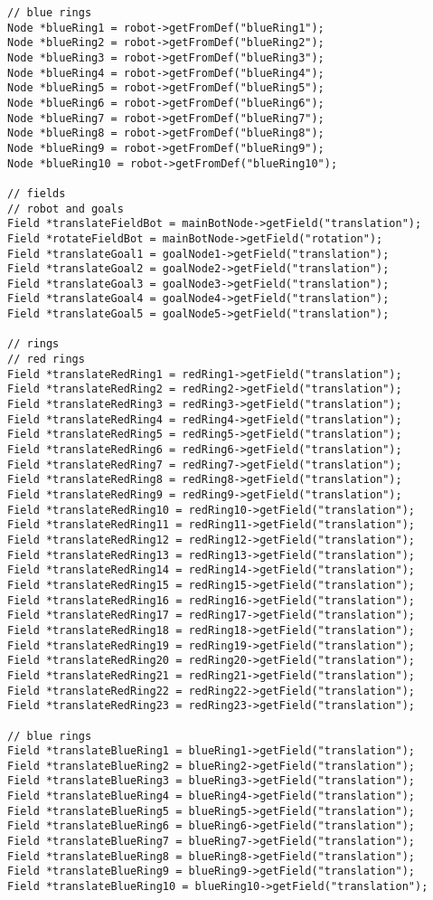 \begin{verbatim}
// blue rings
Node *blueRing1 = robot->getFromDef("blueRing1");
Node *blueRing2 = robot->getFromDef("blueRing2");
Node *blueRing3 = robot->getFromDef("blueRing3");
Node *blueRing4 = robot->getFromDef("blueRing4");
Node *blueRing5 = robot->getFromDef("blueRing5");
Node *blueRing6 = robot->getFromDef("blueRing6");
Node *blueRing7 = robot->getFromDef("blueRing7");
Node *blueRing8 = robot->getFromDef("blueRing8");
Node *blueRing9 = robot->getFromDef("blueRing9");
Node *blueRing10 = robot->getFromDef("blueRing10");
 
// fields
// robot and goals
Field *translateFieldBot = mainBotNode->getField("translation");
Field *rotateFieldBot = mainBotNode->getField("rotation");
Field *translateGoal1 = goalNode1->getField("translation");
Field *translateGoal2 = goalNode2->getField("translation");
Field *translateGoal3 = goalNode3->getField("translation");
Field *translateGoal4 = goalNode4->getField("translation");
Field *translateGoal5 = goalNode5->getField("translation");
 
// rings
// red rings
Field *translateRedRing1 = redRing1->getField("translation");
Field *translateRedRing2 = redRing2->getField("translation");
Field *translateRedRing3 = redRing3->getField("translation");
Field *translateRedRing4 = redRing4->getField("translation");
Field *translateRedRing5 = redRing5->getField("translation");
Field *translateRedRing6 = redRing6->getField("translation");
Field *translateRedRing7 = redRing7->getField("translation");
Field *translateRedRing8 = redRing8->getField("translation");
Field *translateRedRing9 = redRing9->getField("translation");
Field *translateRedRing10 = redRing10->getField("translation");
Field *translateRedRing11 = redRing11->getField("translation");
Field *translateRedRing12 = redRing12->getField("translation");
Field *translateRedRing13 = redRing13->getField("translation");
Field *translateRedRing14 = redRing14->getField("translation");
Field *translateRedRing15 = redRing15->getField("translation");
Field *translateRedRing16 = redRing16->getField("translation");
Field *translateRedRing17 = redRing17->getField("translation");
Field *translateRedRing18 = redRing18->getField("translation");
Field *translateRedRing19 = redRing19->getField("translation");
Field *translateRedRing20 = redRing20->getField("translation");
Field *translateRedRing21 = redRing21->getField("translation");
Field *translateRedRing22 = redRing22->getField("translation");
Field *translateRedRing23 = redRing23->getField("translation");
 
// blue rings
Field *translateBlueRing1 = blueRing1->getField("translation");
Field *translateBlueRing2 = blueRing2->getField("translation");
Field *translateBlueRing3 = blueRing3->getField("translation");
Field *translateBlueRing4 = blueRing4->getField("translation");
Field *translateBlueRing5 = blueRing5->getField("translation");
Field *translateBlueRing6 = blueRing6->getField("translation");
Field *translateBlueRing7 = blueRing7->getField("translation");
Field *translateBlueRing8 = blueRing8->getField("translation");
Field *translateBlueRing9 = blueRing9->getField("translation");
Field *translateBlueRing10 = blueRing10->getField("translation");
\end{verbatim}

